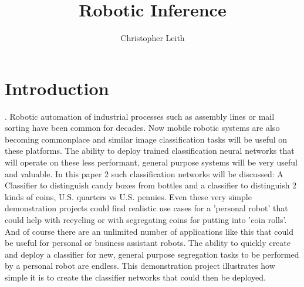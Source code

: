 \documentclass[10pt,journal,compsoc]{IEEEtran}
\begin{document}
\title{Robotic Inference}

\author{Christopher Leith}

%
{}


\maketitle
\IEEEdisplaynontitleabstractindextext
\IEEEpeerreviewmaketitle
\section{Introduction}
\label{sec:introduction}

. 
Robotic automation of industrial processes such as assembly lines or mail sorting have been common for decades. Now mobile robotic systems are also becoming commonplace and similar image classification tasks will be useful on these platforms. The ability to deploy trained classification neural networks that will operate on these less performant, general purpose systems will be very useful and valuable. In this paper 2 such classification networks will be discussed: A Classifier to distinguish candy boxes from bottles and a classifier to distinguish 2 kinds of coins, U.S. quarters vs U.S. pennies. Even these very simple demonstration projects could find realistic use cases for a 'personal robot' that could help with recycling or with segregating coins for putting into 'coin rolls'. And of course there are an unlimited number of applications like this that could be useful for personal or business assistant robots. The ability to quickly create and deploy a classifier for new, general purpose segregation tasks to be performed by a personal robot are endless. This demonstration project illustrates how simple it is to create the classifier networks that could then be deployed.
\end{document}
